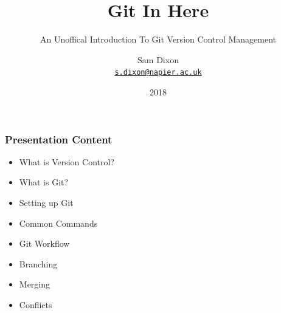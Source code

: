 \documentclass{beamer}
\title{Git In Here}
\subtitle{An Unoffical Introduction To Git Version Control Management}
\author{Sam Dixon\\
{\tt \href{mailto:s.dixon@napier.ac.uk}{s.dixon@napier.ac.uk}}}
\date{2018}
\begin{document}
\frame{\titlepage}
  
\begin{frame}
\frametitle{Presentation Content}
    \begin{itemize}
    \item What is Version Control?
    \item What is Git?
    \item Setting up Git
    \item Common Commands
    \item Git Workflow
    \item Branching
    \item Merging
    \item Conflicts
    \end{itemize}
\end{frame}
\end{document}
